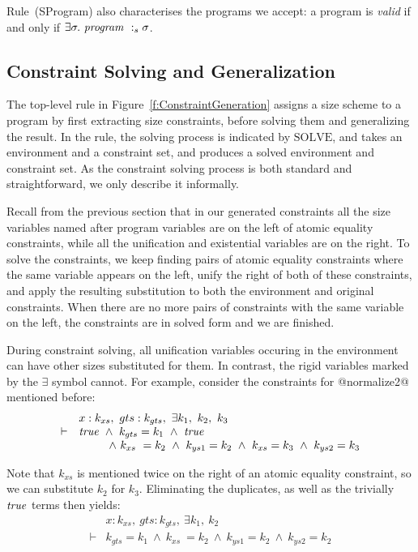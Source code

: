 Rule~(SProgram) also characterises the programs we accept: a program is \emph{valid} if and only if $\exists \sigma.\ \mathit{program} ~:_{s} \sigma$. 

\subsection{Constraint Solving and Generalization}
The top-level rule in Figure~\ref{f:ConstraintGeneration} assigns a size scheme to a program by first extracting size constraints, before solving them and generalizing the result. In the rule, the solving process is indicated by $\textrm{SOLVE}$, and takes an environment and a constraint set, and produces a solved environment and constraint set. As the constraint solving process is both standard and straightforward, we only describe it informally.

Recall from the previous section that in our generated constraints all the size variables named after program variables are on the left of atomic equality constraints, while all the unification and existential variables are on the right. To solve the constraints, we keep finding pairs of atomic equality constraints where the same variable appears on the left, unify the right of both of these constraints, and apply the resulting substitution to both the environment and original constraints. When there are no more pairs of constraints with the same variable on the left, the constraints are in solved form and we are finished.

During constraint solving, all unification variables occuring in the environment can have other sizes substituted for them. In contrast, the rigid variables marked by the $\exists$ symbol cannot. For example, consider the constraints for @normalize2@ mentioned before:
$$
\begin{array}{ll}
       & x : k_{xs},~ gts : k_{gts},~ \exists k_1,~ k_2,~ k_3 
\\
\vdash & \mathit{true} 
        ~\wedge~  k_{gts} = k_1
        ~\wedge~  \mathit{true}
\\     &~~~~~~~~ 
          \wedge~  k_{xs}  ~= k_2
        ~ \wedge~  k_{ys1}  = k_2 
        ~ \wedge~  k_{xs}   = k_3
        ~ \wedge~  k_{ys2}  = k_3
\end{array}
$$

Note that $k_{xs}$ is mentioned twice on the right of an atomic equality constraint, so we can substitute $k_2$ for $k_3$. Eliminating the duplicates, as well as the trivially $\mathit{true}$ terms then yields:
$$
\begin{array}{ll}
       & x : k_{xs},~ gts : k_{gts},~ \exists k_1,~ k_2 
\\
\vdash & k_{gts} = k_1
        ~\wedge~  k_{xs}  ~= k_2
        ~\wedge~  k_{ys1}  = k_2 
        ~\wedge~  k_{ys2}  = k_2
\end{array}
$$

